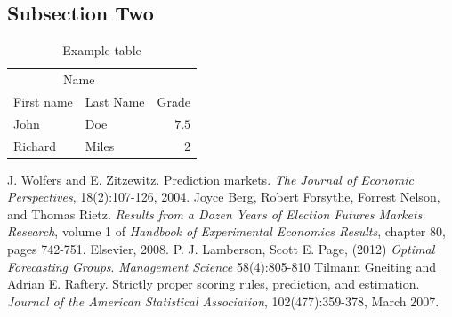 \documentclass[twoside,twocolumn]{article}
\begin{document}
\subsection{Subsection Two}

\blindtext %

\begin{table}
\caption{Example table}
\centering
\begin{tabular}{llr}
\toprule
\multicolumn{2}{c}{Name} \\
\cmidrule(r){1-2}
First name & Last Name & Grade \\
\midrule
John & Doe & $7.5$ \\
Richard & Miles & $2$ \\
\bottomrule
\end{tabular}
\end{table}


\begin{thebibliography}{99} %

J. Wolfers and E. Zitzewitz. Prediction markets. \textit{The Journal of Economic Perspectives},
18(2):107-126, 2004.
 Joyce Berg, Robert Forsythe, Forrest Nelson, and Thomas Rietz. \textit{Results from
a Dozen Years of Election Futures Markets Research}, volume 1 of \textit{Handbook of
Experimental Economics Results}, chapter 80, pages 742-751. Elsevier, 2008.
P. J. Lamberson, Scott E. Page, (2012) \textit{Optimal Forecasting Groups}. \textit{Management Science} 58(4):805-810
Tilmann Gneiting and Adrian E. Raftery. Strictly proper scoring rules, prediction,
and estimation. \textit{Journal of the American Statistical Association}, 102(477):359-378,
March 2007.

 
\end{thebibliography}

\end{document}

